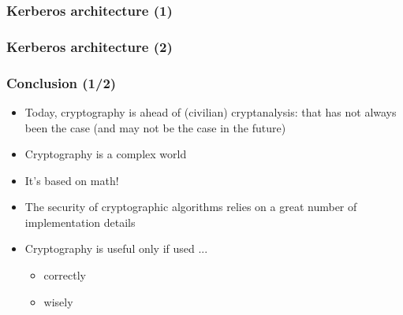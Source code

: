 \documentclass[
hyperref={pdfpagelabels=false}
,xcolor=table
]
{beamer}
\begin{document}
\begin{frame}
  \frametitle{Kerberos architecture (1)}
  
  \begin{center}
  \end{center}  

\end{frame}


\begin{frame}
  \frametitle{Kerberos architecture (2)}
  
  \begin{center}
  \end{center}  

\end{frame}


\begin{frame}
  \frametitle{Conclusion (1/2)}
  \begin{block}{}
    \begin{itemize}
    \item Today, cryptography is ahead of (civilian) cryptanalysis: that has not always been the case (and may not be the case in the future)
    \item Cryptography is a complex world
    \item It's based on math!
    \item The security of cryptographic algorithms relies on a great number of implementation details
    \item Cryptography is useful only if used ...
      \begin{itemize}
      \item correctly
      \item wisely
      \end{itemize}
    \end{itemize}	
  \end{block}
\end{frame}
\end{document}
